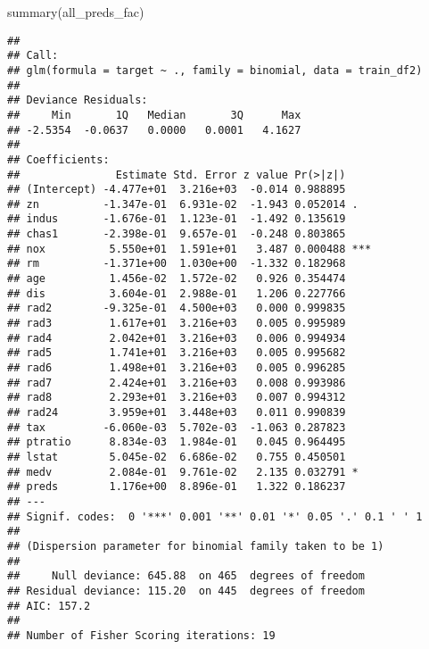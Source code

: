 \documentclass[
]{article}
\newenvironment{Shaded}{\begin{snugshade}}{\end{snugshade}}
\newcommand{\CommentTok}[1]{\textcolor[rgb]{0.56,0.35,0.01}{\textit{#1}}}
\newcommand{\DecValTok}[1]{\textcolor[rgb]{0.00,0.00,0.81}{#1}}
\newcommand{\FloatTok}[1]{\textcolor[rgb]{0.00,0.00,0.81}{#1}}
\newcommand{\FunctionTok}[1]{\textcolor[rgb]{0.00,0.00,0.00}{#1}}
\newcommand{\NormalTok}[1]{#1}
\newcommand{\OtherTok}[1]{\textcolor[rgb]{0.56,0.35,0.01}{#1}}
\newcommand{\SpecialCharTok}[1]{\textcolor[rgb]{0.00,0.00,0.00}{#1}}
\begin{document}
\begin{Shaded}
\begin{Highlighting}[]
\FunctionTok{summary}\NormalTok{(all\_preds\_fac)}
\end{Highlighting}
\end{Shaded}

\begin{verbatim}
## 
## Call:
## glm(formula = target ~ ., family = binomial, data = train_df2)
## 
## Deviance Residuals: 
##     Min       1Q   Median       3Q      Max  
## -2.5354  -0.0637   0.0000   0.0001   4.1627  
## 
## Coefficients:
##               Estimate Std. Error z value Pr(>|z|)    
## (Intercept) -4.477e+01  3.216e+03  -0.014 0.988895    
## zn          -1.347e-01  6.931e-02  -1.943 0.052014 .  
## indus       -1.676e-01  1.123e-01  -1.492 0.135619    
## chas1       -2.398e-01  9.657e-01  -0.248 0.803865    
## nox          5.550e+01  1.591e+01   3.487 0.000488 ***
## rm          -1.371e+00  1.030e+00  -1.332 0.182968    
## age          1.456e-02  1.572e-02   0.926 0.354474    
## dis          3.604e-01  2.988e-01   1.206 0.227766    
## rad2        -9.325e-01  4.500e+03   0.000 0.999835    
## rad3         1.617e+01  3.216e+03   0.005 0.995989    
## rad4         2.042e+01  3.216e+03   0.006 0.994934    
## rad5         1.741e+01  3.216e+03   0.005 0.995682    
## rad6         1.498e+01  3.216e+03   0.005 0.996285    
## rad7         2.424e+01  3.216e+03   0.008 0.993986    
## rad8         2.293e+01  3.216e+03   0.007 0.994312    
## rad24        3.959e+01  3.448e+03   0.011 0.990839    
## tax         -6.060e-03  5.702e-03  -1.063 0.287823    
## ptratio      8.834e-03  1.984e-01   0.045 0.964495    
## lstat        5.045e-02  6.686e-02   0.755 0.450501    
## medv         2.084e-01  9.761e-02   2.135 0.032791 *  
## preds        1.176e+00  8.896e-01   1.322 0.186237    
## ---
## Signif. codes:  0 '***' 0.001 '**' 0.01 '*' 0.05 '.' 0.1 ' ' 1
## 
## (Dispersion parameter for binomial family taken to be 1)
## 
##     Null deviance: 645.88  on 465  degrees of freedom
## Residual deviance: 115.20  on 445  degrees of freedom
## AIC: 157.2
## 
## Number of Fisher Scoring iterations: 19
\end{verbatim}

\begin{Shaded}
\end{Shaded}
\end{document}
